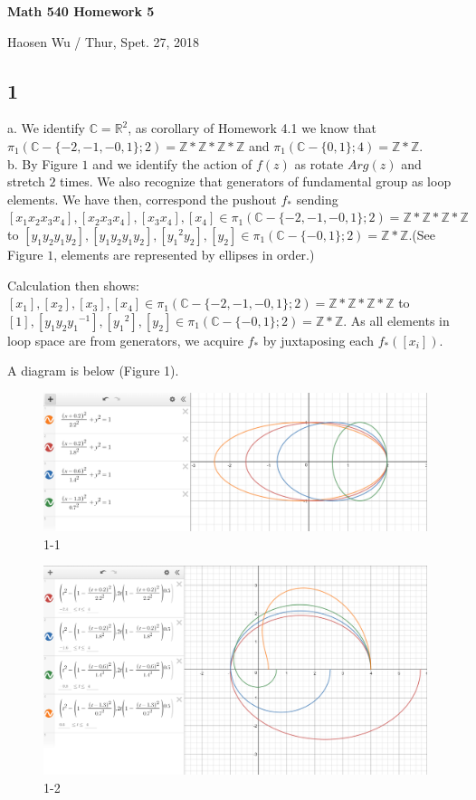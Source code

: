 \documentclass[11pt]{article}
\def\Z{{\mathbb Z}}
\def\R{{\mathbb R}}
\def\C{{\mathbb C}}
\theoremstyle{remark}
\begin{document}
\begin{center}
    \begin{Large} {\bf Math 540 Homework 5}\\
    \end{Large}
    Haosen Wu  / Thur, Spet. 27, 2018
\end{center}


\subsection*{1 }
\indent a. We identify $\C=\R^2$, as corollary of Homework 4.1 we know that $\pi_1(\C-\{-2,-1,-0,1\};2)=\Z*\Z*\Z*\Z$ and $\pi_1(\C-\{0,1\};4)=\Z*\Z$.\\

b. By Figure $1$ and we identify the action of $f(z)$ as rotate $Arg(z)$ and stretch $2$ times. We also recognize that generators of fundamental group as loop elements.  We have then, correspond the pushout $f_*$ sending $[x_1x_2x_3x_4],[x_2x_3x_4],[x_3x_4],[x_4] \in \pi_1(\C-\{-2,-1,-0,1\};2)=\Z*\Z*\Z*\Z$ to $[y_1y_2y_1y_2 ],[y_1y_2y_1y_2],[{y_1}^2 y_2],[y_2] \in \pi_1(\C-\{-0,1\};2)=\Z*\Z$.(See Figure $1$, elements are represented by ellipses in order.)

Calculation then shows: $[x_1],[x_2],[x_3],[x_4] \in \pi_1(\C-\{-2,-1,-0,1\};2)=\Z*\Z*\Z*\Z$ to $[1],[y_1y_2{y_1}^{-1}],[{y_1}^2],[y_2] \in \pi_1(\C-\{-0,1\};2)=\Z*\Z$. As all elements in loop space are from generators, we acquire $f_*$ by juxtaposing each $f_*([x_i])$.

A  diagram is below (Figure 1).
    \begin{figure}[h!]
    \centering
    \includegraphics[scale=0.33]{5she1}
    \caption{1-1}
    \end{figure}
    \begin{figure}[h!]
    \centering
    \includegraphics[scale=0.26]{5she2}
    \caption{1-2}
    \end{figure}
\end{document}
